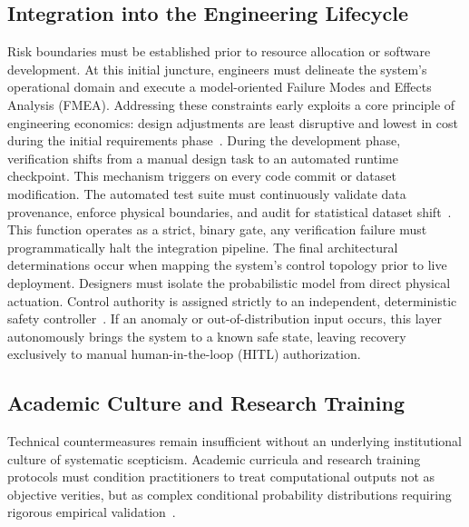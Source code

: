 ﻿\documentclass[11pt,a4paper]{article}
\begin{document}
\subsection{Integration into the Engineering Lifecycle}
Risk boundaries must be established prior to resource allocation or software development. At this initial juncture, engineers must delineate the system's operational domain and execute a model-oriented Failure Modes and Effects Analysis (FMEA). Addressing these constraints early exploits a core principle of engineering economics: design adjustments are least disruptive and lowest in cost during the initial requirements phase~\cite{boehm1981}. During the development phase, verification shifts from a manual design task to an automated runtime checkpoint. This mechanism triggers on every code commit or dataset modification. The automated test suite must continuously validate data provenance, enforce physical boundaries, and audit for statistical dataset shift~\cite{quinonero2009}. This function operates as a strict, binary gate, any verification failure must programmatically halt the integration pipeline. The final architectural determinations occur when mapping the system's control topology prior to live deployment. Designers must isolate the probabilistic model from direct physical actuation. Control authority is assigned strictly to an independent, deterministic safety controller~\cite{leveson2012}. If an anomaly or out-of-distribution input occurs, this layer autonomously brings the system to a known safe state, leaving recovery exclusively to manual human-in-the-loop (HITL) authorization.

\subsection{Academic Culture and Research Training}
Technical countermeasures remain insufficient without an underlying institutional culture of systematic scepticism. Academic curricula and research training protocols must condition practitioners to treat computational outputs not as objective verities, but as complex conditional probability distributions requiring rigorous empirical validation~\cite{gal2016}.
\end{document}
